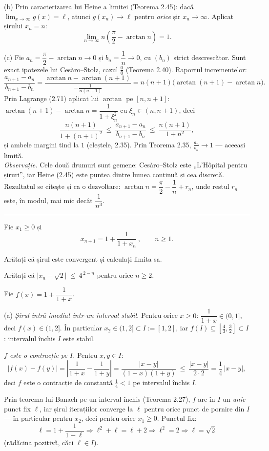 (b) Prin caracterizarea lui Heine a limitei (Teorema 2.45): dacă $\lim_{x\to\infty}g(x)=\ell$, atunci $g(x_{n})\to\ell$ pentru \emph{orice} șir $x_{n}\to\infty$. Aplicat șirului $x_{n}=n$:
\[ \lim_{n\to\infty}n\left(\frac\pi2-\arctan n\right)=1 . \]

(c) Fie $a_{n}=\dfrac\pi2-\arctan n\to0$ și $b_{n}=\dfrac1n\to0$, cu $(b_{n})$ strict descrescător. Sunt exact ipotezele lui Cesàro--Stolz, cazul $\frac00$ (Teorema 2.40). Raportul incrementelor:
\[ \frac{a_{n+1}-a_{n}}{b_{n+1}-b_{n}}=\frac{\arctan n-\arctan(n+1)}{-\frac{1}{n(n+1)}}=n(n+1)\bigl(\arctan(n+1)-\arctan n\bigr) . \]
Prin Lagrange (2.71) aplicat lui $\arctan$ pe $[n,n+1]$: $\arctan(n+1)-\arctan n=\dfrac{1}{1+\xi_{n}^{2}}$ cu $\xi_{n}\in(n,n+1)$, deci
\[ \frac{n(n+1)}{1+(n+1)^{2}}\ \le\ \frac{a_{n+1}-a_{n}}{b_{n+1}-b_{n}}\ \le\ \frac{n(n+1)}{1+n^{2}} , \]
și ambele margini tind la $1$ (cleștele, 2.35). Prin Teorema 2.35, $\frac{a_{n}}{b_{n}}\to1$ --- aceeași limită.\\[2pt]
\emph{Observație.} Cele două drumuri sunt gemene: Cesàro--Stolz este „L'Hôpital pentru șiruri'', iar Heine (2.45) este puntea dintre lumea continuă și cea discretă. Rezultatul se citește și ca o dezvoltare: $\arctan n=\dfrac\pi2-\dfrac1n+r_{n}$, unde restul $r_{n}$ este, în modul, mai mic decât $\dfrac{1}{n^{3}}$.
\vspace{1mm}\hrule

Fie $x_{1}\ge0$ și
\[ x_{n+1}=1+\frac{1}{1+x_{n}}\ ,\qquad n\ge1 . \]
\begin{parti}
  \item Arătați că șirul este convergent și calculați limita sa.
  \item Arătați că $\bigl|x_{n}-\sqrt2\bigr|\ \le\ 4^{\,2-n}$ pentru orice $n\ge2$.
\end{parti}
\sol Fie $f(x)=1+\dfrac{1}{1+x}$.

(a) \emph{Șirul intră imediat într-un interval stabil.} Pentru orice $x\ge0$: $\dfrac1{1+x}\in(0,1]$, deci $f(x)\in(1,2]$. În particular $x_{2}\in(1,2]\subset I:=[1,2]$, iar $f(I)\subseteq\left[\frac43,\frac32\right]\subset I$: intervalul închis $I$ este stabil.

\emph{$f$ este o contracție pe $I$.} Pentru $x,y\in I$:
\[ |f(x)-f(y)|=\left|\frac{1}{1+x}-\frac{1}{1+y}\right|=\frac{|x-y|}{(1+x)(1+y)}\ \le\ \frac{|x-y|}{2\cdot2}=\frac14\,|x-y| , \]
deci $f$ este o contracție de constantă $\frac14<1$ pe intervalul închis $I$.

Prin teorema lui Banach pe un interval închis (Teorema 2.27), $f$ are în $I$ un \emph{unic} punct fix $\ell$, iar șirul iterațiilor converge la $\ell$ pentru orice punct de pornire din $I$ --- în particular pentru $x_{2}$, deci pentru orice $x_{1}\ge0$. Punctul fix:
\[ \ell=1+\frac{1}{1+\ell} \Longrightarrow \ell^{2}+\ell=\ell+2 \Longrightarrow \ell^{2}=2 \Longrightarrow \ell=\sqrt2 \]
(rădăcina pozitivă, căci $\ell\in I$).

